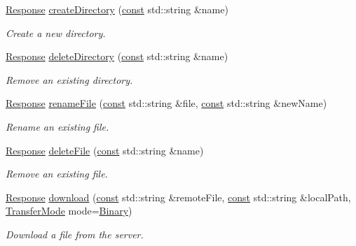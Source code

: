 \begin{DoxyCompactItemize}
\hyperlink{classsf_1_1_ftp_1_1_response}{Response} \hyperlink{classsf_1_1_ftp_a247b84c4b25da37804218c2b748c4787}{create\-Directory} (\hyperlink{term__entry_8h_a57bd63ce7f9a353488880e3de6692d5a}{const} std\-::string \&name)
\begin{DoxyCompactList}\small\item\em Create a new directory. \end{DoxyCompactList}\item 
\hyperlink{classsf_1_1_ftp_1_1_response}{Response} \hyperlink{classsf_1_1_ftp_a2a8a7ef9144204b5b319c9a4be8806c2}{delete\-Directory} (\hyperlink{term__entry_8h_a57bd63ce7f9a353488880e3de6692d5a}{const} std\-::string \&name)
\begin{DoxyCompactList}\small\item\em Remove an existing directory. \end{DoxyCompactList}\item 
\hyperlink{classsf_1_1_ftp_1_1_response}{Response} \hyperlink{classsf_1_1_ftp_a8f99251d7153e1dc26723e4006deb764}{rename\-File} (\hyperlink{term__entry_8h_a57bd63ce7f9a353488880e3de6692d5a}{const} std\-::string \&file, \hyperlink{term__entry_8h_a57bd63ce7f9a353488880e3de6692d5a}{const} std\-::string \&new\-Name)
\begin{DoxyCompactList}\small\item\em Rename an existing file. \end{DoxyCompactList}\item 
\hyperlink{classsf_1_1_ftp_1_1_response}{Response} \hyperlink{classsf_1_1_ftp_a8aa272b0eb7769a850006e70fcad370f}{delete\-File} (\hyperlink{term__entry_8h_a57bd63ce7f9a353488880e3de6692d5a}{const} std\-::string \&name)
\begin{DoxyCompactList}\small\item\em Remove an existing file. \end{DoxyCompactList}\item 
\hyperlink{classsf_1_1_ftp_1_1_response}{Response} \hyperlink{classsf_1_1_ftp_a20c1600ec5fd6f5a2ad1429ab8aa5df4}{download} (\hyperlink{term__entry_8h_a57bd63ce7f9a353488880e3de6692d5a}{const} std\-::string \&remote\-File, \hyperlink{term__entry_8h_a57bd63ce7f9a353488880e3de6692d5a}{const} std\-::string \&local\-Path, \hyperlink{classsf_1_1_ftp_a1cd6b89ad23253f6d97e6d4ca4d558cb}{Transfer\-Mode} mode=\hyperlink{classsf_1_1_ftp_a1cd6b89ad23253f6d97e6d4ca4d558cba8d9a3497be63da2bf7ed663b1bfd7449}{Binary})
\begin{DoxyCompactList}\small\item\em Download a file from the server. \end{DoxyCompactList}\item 

\end{DoxyCompactItemize}
